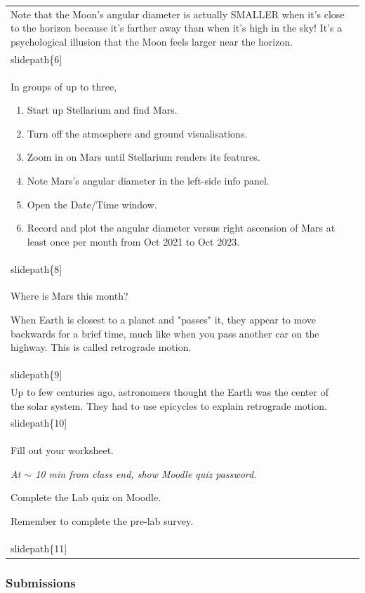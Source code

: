 \documentclass[12pt]{article}
\begin{document}
\begin{longtable}{|m{}|m{}|}
Note that the Moon's angular diameter is actually SMALLER when it's close to the horizon because it's farther away than when it's high in the sky! It's a psychological illusion that the Moon feels larger near the horizon.
 & \texttt{[image: \\slidepath\{6]}}\\\hline
In groups of up to three,
\begin{enumerate}
\item Start up Stellarium and find Mars.
\item Turn off the atmosphere and ground visualisations.
\item Zoom in on Mars until Stellarium renders its features.
\item Note Mars's angular diameter in the left-side info panel.
\item Open the Date/Time window. 
\item Record and plot the angular diameter versus right ascension of Mars at least once per month from Oct 2021 to Oct 2023.
\end{enumerate}
 & \texttt{[image: \\slidepath\{8]}}\\\hline
Where is Mars this month? 

When Earth is closest to a planet and "passes" it, they appear to move backwards for a brief time, much like when you pass another car on the highway. This is called retrograde motion.
 & \texttt{[image: \\slidepath\{9]}}\\\hline
Up to few centuries ago, astronomers thought the Earth was the center of the solar system. They had to use epicycles to explain retrograde motion.
 & \texttt{[image: \\slidepath\{10]}}\\\hline
Fill out your worksheet.

\emph{At $\sim$ 10 min from class end, show Moodle quiz password.} 

Complete the Lab quiz on Moodle.

Remember to complete the pre-lab survey. & \texttt{[image: \\slidepath\{11]}}\\\hline
\end{longtable}


\subsubsection{Submissions}
\end{document}
